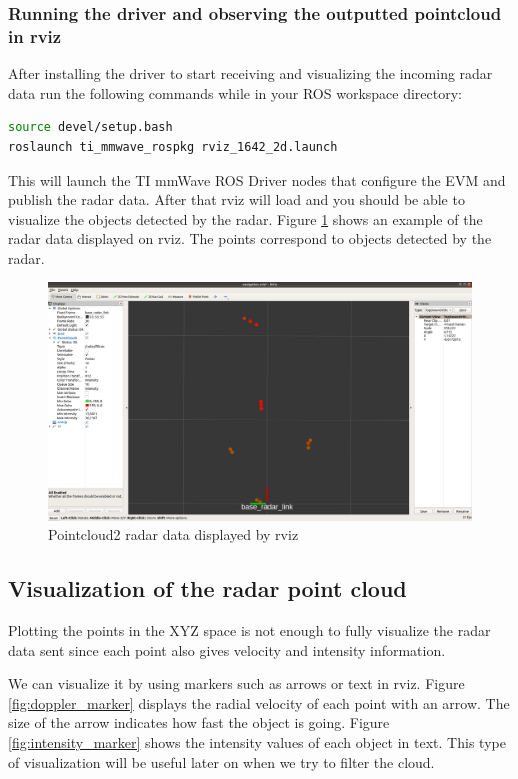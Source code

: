 \subsubsection{Running the driver and observing the outputted pointcloud in rviz}
After installing the driver \cite{tisetup} to start receiving and visualizing the incoming radar data run the following commands while in your ROS workspace directory:
 \begin{lstlisting}[language=bash]
source devel/setup.bash
roslaunch ti_mmwave_rospkg rviz_1642_2d.launch
\end{lstlisting}
This will launch the TI mmWave ROS Driver nodes that configure the EVM and publish the radar data. After that rviz will load and you should be able to visualize the objects detected by the radar. Figure \ref{fig:radar_rviz} shows an example of the radar data displayed on rviz. The points correspond to objects   detected by the radar.
\begin{figure}[!htb]
    \centering
    \includegraphics[scale=0.2]{imgs/chapter4/radardatarviz.png}
    \caption{Pointcloud2 radar data displayed by rviz}
    \label{fig:radar_rviz}
\end{figure}

\subsection{Visualization of the radar point cloud}
Plotting the points in the XYZ space is not enough to fully visualize the radar data sent since each point also gives velocity and intensity information.

We can visualize it by using markers such as arrows or text in rviz.
Figure \ref{fig:doppler_marker} displays the radial velocity of each point with an arrow. The size of the arrow indicates how fast the object is going. Figure \ref{fig:intensity_marker} shows the intensity values of each object in text. This type of visualization will be useful later on when we try to filter the cloud.


